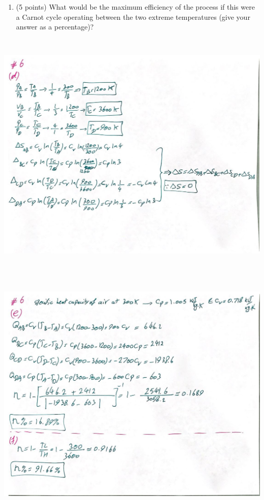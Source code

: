 \documentclass[fleqn]{article}
\begin{document}
\begin{enumerate}
\begin{enumerate}
      \item (5 points) What would be the maximum efficiency of the process if this were a Carnot cycle
      operating between the two extreme temperatures (give your answer as a percentage)?

    \end{enumerate}

    \begin{center}
      \includegraphics[height=12cm, width=15cm]{6d.JPG}
    \end{center}

    \pagebreak

    \begin{center}
      \includegraphics[height=12cm, width=15cm]{6ef.JPG}
    \end{center}


\end{enumerate}
\end{document}
